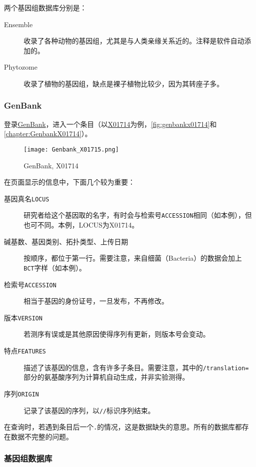 两个基因组数据库分别是：
\begin{description}
	\item[Ensemble] 收录了各种动物的基因组，尤其是与人类亲缘关系近的。注释是软件自动添加的。
	\item[Phytozome] 收录了植物的基因组，缺点是裸子植物比较少，因为其转座子多。
\end{description}

\subsubsection{GenBank}

登录\href{https://www.ncbi.nlm.nih.gov/genbank/}{GenBank}，进入一个条目（以\href{https://www.ncbi.nlm.nih.gov/nuccore/X01714}{X01714}为例，\autoref{fig:genbankx01714}和\autoref{chapter:GenbankX01714}）。

\begin{figure}[htbp]
	\centering
	\texttt{[image: Genbank\_X01715.png]}
	\caption{GenBank, X01714}
	\label{fig:genbankx01714}
\end{figure}

在页面显示的信息中，下面几个较为重要：

\begin{description}
	\item[基因真名\texttt{LOCUS}] 研究者给这个基因取的名字，有时会与检索号\texttt{ACCESSION}相同（如本例），但也可不同。本例，LOCUS为X01714。
	\item[碱基数、基因类别、拓扑类型、上传日期] 按顺序，都位于第一行。需要注意，来自细菌（Bacteria）的数据会加上\texttt{BCT}字样（如本例）。
	\item[检索号\texttt{ACCESSION}] 相当于基因的身份证号，一旦发布，不再修改。
	\item[版本\texttt{VERSION}] 若测序有误或是其他原因使得序列有更新，则版本号会变动。
	\item[特点\texttt{FEATURES}] 描述了该基因的信息，含有许多子条目。需要注意，其中的\texttt{/translation=}部分的氨基酸序列为计算机自动生成，并非实验测得。
	\item[序列\texttt{ORIGIN}] 记录了该基因的序列，以\texttt{//}标识序列结束。
\end{description}

在查询时，若遇到条目后一个\texttt{.}的情况，这是数据缺失的意思。所有的数据库都存在数据不完整的问题。

\subsubsection{基因组数据库}

